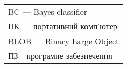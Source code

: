 
\begin{tabular}{l}
	BC — Bayes classifier \\	         					
	ПК — портативний комп'ютер	\\
	BLOB — Binary Large Object \\
	ПЗ - програмне забезпечення
\end{tabular}